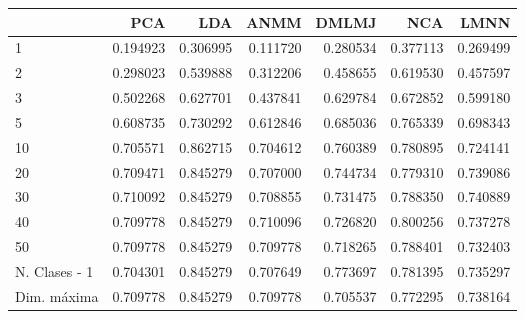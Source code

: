 \begin{tabular}{lrrrrrr}
\toprule
{} &       PCA &       LDA &      ANMM &     DMLMJ &       NCA &      LMNN \\
\midrule
1             &  0.194923 &  0.306995 &  0.111720 &  0.280534 &  0.377113 &  0.269499 \\
2             &  0.298023 &  0.539888 &  0.312206 &  0.458655 &  0.619530 &  0.457597 \\
3             &  0.502268 &  0.627701 &  0.437841 &  0.629784 &  0.672852 &  0.599180 \\
5             &  0.608735 &  0.730292 &  0.612846 &  0.685036 &  0.765339 &  0.698343 \\
10            &  0.705571 &  0.862715 &  0.704612 &  0.760389 &  0.780895 &  0.724141 \\
20            &  0.709471 &  0.845279 &  0.707000 &  0.744734 &  0.779310 &  0.739086 \\
30            &  0.710092 &  0.845279 &  0.708855 &  0.731475 &  0.788350 &  0.740889 \\
40            &  0.709778 &  0.845279 &  0.710096 &  0.726820 &  0.800256 &  0.737278 \\
50            &  0.709778 &  0.845279 &  0.709778 &  0.718265 &  0.788401 &  0.732403 \\
N. Clases - 1 &  0.704301 &  0.845279 &  0.707649 &  0.773697 &  0.781395 &  0.735297 \\
Dim. máxima   &  0.709778 &  0.845279 &  0.709778 &  0.705537 &  0.772295 &  0.738164 \\
\bottomrule
\end{tabular}
